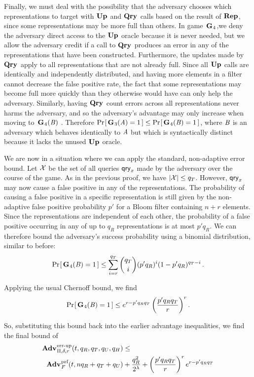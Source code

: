 Finally, we must deal with the possibility that the adversary chooses which
representations to target with $\textup{\textbf{Up}}\hspace{0.5pt}$ and $\textup{\textbf{Qry}}\hspace{0.5pt}$ calls based on the result of
$\textup{\textbf{Rep}}\hspace{0.5pt}$, since some representations may be more full than others. In
game~$\textup{\textbf{G}}\hspace{0.5pt}_4$,we deny the adversary direct access to the $\textup{\textbf{Up}}\hspace{0.5pt}$ oracle
because it is never needed, but we allow the adversary credit if a call to
$\textup{\textbf{Qry}}\hspace{0.5pt}$ produces an error in any of the representations that have been
constructed. Furthermore, the updates made by $\textup{\textbf{Qry}}\hspace{0.5pt}$ apply to all
representations that are not already full. Since all $\textup{\textbf{Up}}\hspace{0.5pt}$ calls are
identically and independently distributed, and having more elements in a filter
cannot decrease the false positive rate, the fact that some representations may
become full more quickly than they otherwise would have can only help the
adversary. Similarly, having $\textup{\textbf{Qry}}\hspace{0.5pt}$ count errors across all representations
never harms the adversary, and so the adversary's advantage may only increase
when moving to~$\textup{\textbf{G}}\hspace{0.5pt}_4(\mathit{B})$ . Therefore $\Pr\hspace{-1pt}\left[\,\textup{\textbf{G}}\hspace{0.5pt}_3(\mathit{A}) = 1\,\right] \le
\Pr\hspace{-1pt}\left[\,\textup{\textbf{G}}\hspace{0.5pt}_4(\mathit{B}) = 1\,\right]$, where $\mathit{B}$ is an adversary which behaves
identically to $\mathit{A}$ but which is syntactically distinct because it lacks the
unused $\textup{\textbf{Up}}\hspace{0.5pt}$ oracle.
%

We are now in a situation where we can apply the standard, non-adaptive error
bound. Let $\mathcal{X}$ be the set of all queries $\mathsf{qry}_x$ made by the adversary over
the course of the game. As in the previous proof, we have $|\mathcal{X}| \le q_T$.
However, $\mathsf{qry}_x$ may now cause a false positive in any of the representations.
The probability of causing a false positive in a specific representation is
still given by the non-adaptive false positive probability $p'$ for a Bloom
filter containing $n+r$ elements. Since the representations are independent of
each other, the probability of a false positive occurring in any of up to $q_R$
representations is at most $p'q_R$. We can therefore bound the adversary's
success probability using a binomial distribution, similar to before:
\begin{equation}
   \Pr\hspace{-1pt}\left[\,\textup{\textbf{G}}\hspace{0.5pt}_4(\mathit{B})=1\,\right] \le
     \sum_{i=r}^{q_T} \binom{q_T}{i}(p'q_R)^i(1-p'q_R)^{q_T-i} \,.
\end{equation}

Applying the usual Chernoff bound, we find
\begin{equation}
   \Pr\hspace{-1pt}\left[\,\textup{\textbf{G}}\hspace{0.5pt}_4(\mathit{B})=1\,\right] \le
     e^{r-p'q_Rq_T}\left(\frac{p'q_Rq_T}{r}\right)^r.
\end{equation}

So, substituting this bound back into the earlier advantage inequalities, we find the final bound of
\begin{equation*}
  \begin{aligned}
    \Adv{\errep}_{\Pi,\delta,r}(t, q_R,q_T,q_U,q_H) &\leq \\
      \Adv{\prf}_F(t,nq_R+q_T+q_U) & +
    \frac{q_R^2}{2^\lambda} +
    \left(\frac{p'q_Rq_T}{r}\right)^re^{r-p'q_Rq_T}
  \end{aligned}
\end{equation*}
